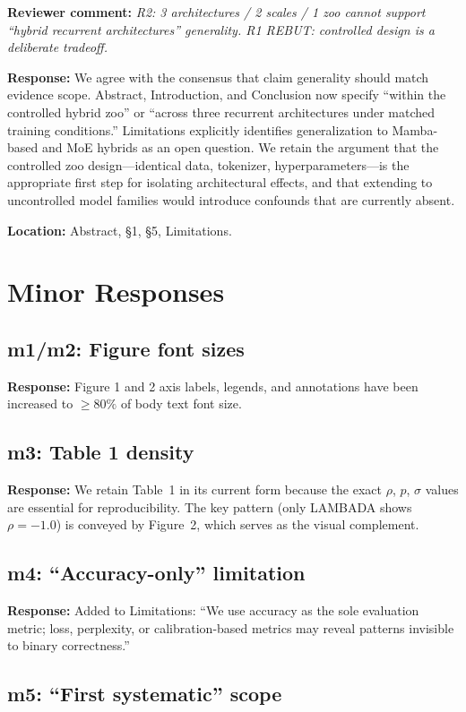 \documentclass[11pt]{article}
\newcommand{\reviewer}[1]{\textcolor{reviewercolor}{\textbf{Reviewer comment:} \textit{#1}}}
\newcommand{\response}[1]{\textcolor{responsecolor}{\textbf{Response:} #1}}
\newcommand{\location}[1]{\textbf{Location:} #1}
\begin{document}
\reviewer{R2: 3 architectures / 2 scales / 1 zoo cannot support ``hybrid recurrent architectures'' generality. R1 REBUT: controlled design is a deliberate tradeoff.}

\response{We agree with the consensus that claim generality should match evidence scope. Abstract, Introduction, and Conclusion now specify ``within the controlled hybrid zoo'' or ``across three recurrent architectures under matched training conditions.'' Limitations explicitly identifies generalization to Mamba-based and MoE hybrids as an open question. We retain the argument that the controlled zoo design---identical data, tokenizer, hyperparameters---is the appropriate first step for isolating architectural effects, and that extending to uncontrolled model families would introduce confounds that are currently absent.}

\location{Abstract, \S1, \S5, Limitations.}

\section*{Minor Responses}

\subsection*{m1/m2: Figure font sizes}

\response{Figure 1 and 2 axis labels, legends, and annotations have been increased to $\geq 80\%$ of body text font size.}

\subsection*{m3: Table 1 density}

\response{We retain Table~1 in its current form because the exact $\rho$, $p$, $\sigma$ values are essential for reproducibility. The key pattern (only LAMBADA shows $\rho = -1.0$) is conveyed by Figure~2, which serves as the visual complement.}

\subsection*{m4: ``Accuracy-only'' limitation}

\response{Added to Limitations: ``We use accuracy as the sole evaluation metric; loss, perplexity, or calibration-based metrics may reveal patterns invisible to binary correctness.''}

\subsection*{m5: ``First systematic'' scope}
\end{document}
